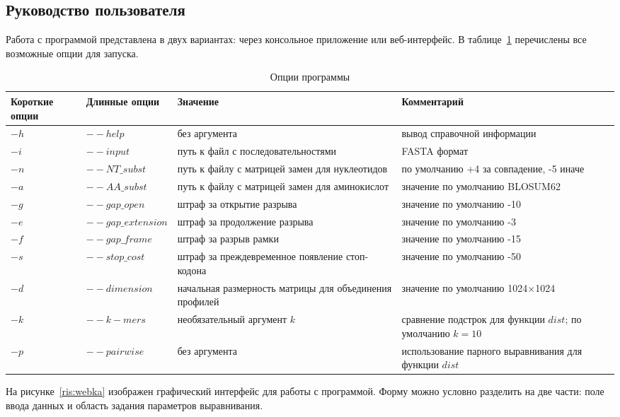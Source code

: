 \subsection[Руководство пользователя]{\large Руководство пользователя}
\hspace{\parindent} Работа с программой представлена в двух вариантах: через консольное приложение или веб-интерфейс. В таблице~\ref{tabular:options} перечислены все возможные опции для запуска.
\begin{table}[H]
\caption{Опции программы}
\label{tabular:options}
\begin{center}
\begin{tabular}{|p{2.4cm}|p{3.5cm}|p{5.2cm}|p{4.4cm}|}
\hline
Короткие опции& Длинные опции& Значение& Комментарий\\
\hline
$-h$& $--help$& без аргумента& вывод справочной информации\\
\hline
$-i$& $--input$& путь к файл с последовательностями & FASTA формат\\
\hline
$-n$& $--NT\_subst$& путь к файлу с матрицей замен для нуклеотидов & по умолчанию +4 за совпадение, -5 иначе\\
\hline
$-a$& $--AA\_subst$& путь к файлу с матрицей замен для аминокислот& значение по умолчанию BLOSUM62\\
\hline
$-g$& $--gap\_open$& штраф за открытие разрыва& значение по умолчанию -10\\
\hline
$-e$ & $--gap\_extension$& штраф за продолжение разрыва& значение по умолчанию -3\\
\hline
$-f$& $--gap\_frame$& штраф за разрыв рамки& значение по умолчанию -15\\
\hline
$-s$& $--stop\_cost$& штраф за преждевременное появление стоп-кодона& значение по умолчанию -50\\
\hline
$-d$& $--dimension$& начальная размерность матрицы для объединения профилей& значение по умолчанию 1024$\times$1024\\
\hline
$-k$& $--k-mers$& необязательный аргумент $k$& сравнение подстрок для функции $dist$; по умолчанию $k=10$ \\
\hline
$-p$& $--pairwise$& без аргумента& использование парного выравнивания для функции $dist$\\
\hline
\end{tabular}
\end{center}
\end{table}

На рисунке~\ref{ris:webka} изображен графический интерфейс для работы с программой. Форму можно условно разделить на две части: поле ввода данных и область задания параметров выравнивания. 

